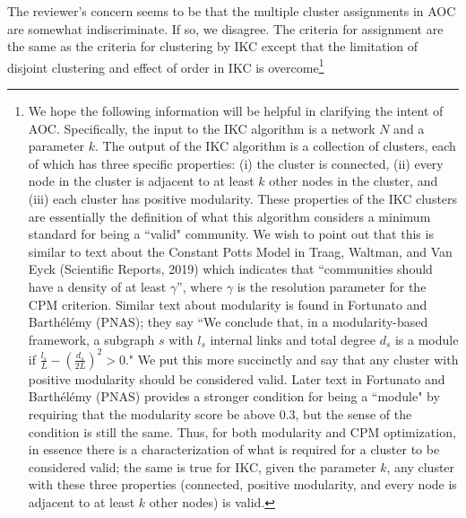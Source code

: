 \documentclass[11pt, oneside]{article}   	%
\begin{document}
\vspace{2 mm} The reviewer's concern seems to be that the multiple cluster assignments in AOC are somewhat indiscriminate. If so, we disagree. The criteria for assignment are the same as the criteria for clustering by IKC except that the limitation of disjoint clustering and effect of order in IKC is overcome\footnote{ We hope the following information will be helpful in clarifying the intent of AOC.  Specifically, the input to the IKC algorithm is a network $N$ and a parameter $k$. The output of the IKC algorithm is a collection of clusters, each of which has three specific properties: (i) the cluster is connected, (ii) every node in the cluster is adjacent to at least $k$ other nodes in the cluster, and (iii) each cluster has positive modularity. These properties of the IKC clusters are essentially the definition of what this algorithm considers  a minimum standard for being a ``valid" community.  We wish to point out that this is similar to text about the Constant Potts Model in Traag, Waltman, and Van Eyck (Scientific Reports, 2019) which indicates that ``communities should have a density of at least $\gamma$'', where $\gamma$ is the resolution parameter for the CPM criterion.  Similar text about modularity is found in Fortunato and Barth\'el\'emy (PNAS); they  say ``We conclude that, in a modularity-based framework, a subgraph $s$ with $l_s$ internal links and total degree $d_s$ is a 
module if $\frac{l_s}{L} - \left( \frac{d_s}{2L} \right) ^2 > 0$."  We put this more succinctly and say that any cluster with positive modularity should be considered valid. 
Later text in Fortunato and Barth\'el\'emy (PNAS) provides a stronger condition for being a ``module" by requiring that the modularity score be above 0.3, but the sense of the condition is still the same. Thus, for both modularity and CPM optimization, in essence there is a characterization of what is required for a cluster to be considered valid; the same is true for IKC, given the parameter $k$, any cluster with these three properties (connected, positive modularity, and every node is adjacent to at least $k$ other nodes) is valid. 

}
\end{document}
